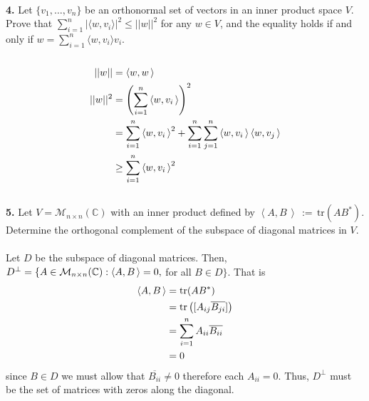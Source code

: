 \documentclass[11pt]{amsart}
\theoremstyle{definition}  %
\newcommand{\C}{\mathbb{C}}
\begin{document}
\\
\newpage
\vskip 0.1cm
\noindent
{\bf 4.} Let $\{v_1, \ldots, v_n\}$ be an orthonormal set of vectors in an inner product space $V$. Prove that  $\sum_{i=1}^n |\langle w, v_i\rangle|^2 \leq || w||^2$ 
for any $w \in V$, and the equality holds if and only if $  w = \sum_{i=1}^n \langle w, v_i \rangle v_i$. \\
\\
\begin{align*}
	|| w || &= \left\langle w,w \,\right\rangle\\
	|| w||^2 &= \left(\sum_{i=1}^n \left\langle w,v_i \,\right\rangle\right)^2\\
	&= \sum_{i=1}^n \left\langle w,v_i \,\right\rangle^2 + \sum_{i=1}^n\sum_{j=1}^n \left\langle w,v_i \,\right\rangle\left\langle w,v_j \,\right\rangle\\
	&\geq \sum_{i=1}^n \left\langle w,v_i \,\right\rangle^2
\end{align*}
\\


\newpage
\vskip 0.1cm
\noindent
{\bf 5.} Let $V = \mathcal{M}_{n \times n}(\C)$ with an inner product defined by $\left \langle A, B \,\right \rangle \, :=  \, \mathrm{tr}(AB^*)$. Determine the orthogonal complement
of the subspace of diagonal matrices in $V$. \\
\\
Let $D$ be the subspace of diagonal matrices.  Then, $D^\perp = \{A \in \mathcal{M}_{n\times n}(\C): \IP{A,B} = 0,$ for all $B \in D\}$.  That is 
\begin{align*}
	\left\langle A,B \,\right\rangle &= \mathrm{tr}(AB^*) \\
	&= \mathrm{tr}\left([A_{ij}\overline{B_{ji}}]\right) \\
	&= \sum_{i=1}^n A_{ii}\overline{B_{ii}} \\
	&= 0
\end{align*}since $B \in D$ we must allow that $\overline{B_{ii}} \ne 0$ therefore each $A_{ii}=0$.  Thus, $D^\perp$ must be the set of matrices with zeros along the diagonal.
\\
\end{document}

